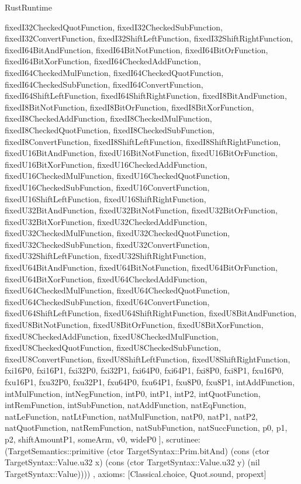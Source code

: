 \begin{lexlean}{RustRuntime}
\begin{semanticmodule}
{{      fixedI32CheckedQuotFunction,
      fixedI32CheckedSubFunction,
      fixedI32ConvertFunction,
      fixedI32ShiftLeftFunction,
      fixedI32ShiftRightFunction,
      fixedI64BitAndFunction,
      fixedI64BitNotFunction,
      fixedI64BitOrFunction,
      fixedI64BitXorFunction,
      fixedI64CheckedAddFunction,
      fixedI64CheckedMulFunction,
      fixedI64CheckedQuotFunction,
      fixedI64CheckedSubFunction,
      fixedI64ConvertFunction,
      fixedI64ShiftLeftFunction,
      fixedI64ShiftRightFunction,
      fixedI8BitAndFunction,
      fixedI8BitNotFunction,
      fixedI8BitOrFunction,
      fixedI8BitXorFunction,
      fixedI8CheckedAddFunction,
      fixedI8CheckedMulFunction,
      fixedI8CheckedQuotFunction,
      fixedI8CheckedSubFunction,
      fixedI8ConvertFunction,
      fixedI8ShiftLeftFunction,
      fixedI8ShiftRightFunction,
      fixedU16BitAndFunction,
      fixedU16BitNotFunction,
      fixedU16BitOrFunction,
      fixedU16BitXorFunction,
      fixedU16CheckedAddFunction,
      fixedU16CheckedMulFunction,
      fixedU16CheckedQuotFunction,
      fixedU16CheckedSubFunction,
      fixedU16ConvertFunction,
      fixedU16ShiftLeftFunction,
      fixedU16ShiftRightFunction,
      fixedU32BitAndFunction,
      fixedU32BitNotFunction,
      fixedU32BitOrFunction,
      fixedU32BitXorFunction,
      fixedU32CheckedAddFunction,
      fixedU32CheckedMulFunction,
      fixedU32CheckedQuotFunction,
      fixedU32CheckedSubFunction,
      fixedU32ConvertFunction,
      fixedU32ShiftLeftFunction,
      fixedU32ShiftRightFunction,
      fixedU64BitAndFunction,
      fixedU64BitNotFunction,
      fixedU64BitOrFunction,
      fixedU64BitXorFunction,
      fixedU64CheckedAddFunction,
      fixedU64CheckedMulFunction,
      fixedU64CheckedQuotFunction,
      fixedU64CheckedSubFunction,
      fixedU64ConvertFunction,
      fixedU64ShiftLeftFunction,
      fixedU64ShiftRightFunction,
      fixedU8BitAndFunction,
      fixedU8BitNotFunction,
      fixedU8BitOrFunction,
      fixedU8BitXorFunction,
      fixedU8CheckedAddFunction,
      fixedU8CheckedMulFunction,
      fixedU8CheckedQuotFunction,
      fixedU8CheckedSubFunction,
      fixedU8ConvertFunction,
      fixedU8ShiftLeftFunction,
      fixedU8ShiftRightFunction,
      fxi16P0,
      fxi16P1,
      fxi32P0,
      fxi32P1,
      fxi64P0,
      fxi64P1,
      fxi8P0,
      fxi8P1,
      fxu16P0,
      fxu16P1,
      fxu32P0,
      fxu32P1,
      fxu64P0,
      fxu64P1,
      fxu8P0,
      fxu8P1,
      intAddFunction,
      intMulFunction,
      intNegFunction,
      intP0,
      intP1,
      intP2,
      intQuotFunction,
      intRemFunction,
      intSubFunction,
      natAddFunction,
      natEqFunction,
      natLeFunction,
      natLtFunction,
      natMulFunction,
      natP0,
      natP1,
      natP2,
      natQuotFunction,
      natRemFunction,
      natSubFunction,
      natSuccFunction,
      p0,
      p1,
      p2,
      shiftAmountP1,
      someArm,
      v0,
      wideP0
    ],
    scrutinee: (TargetSemantics::primitive (ctor TargetSyntax::Prim.bitAnd) (cons (ctor TargetSyntax::Value.u32 x) (cons (ctor TargetSyntax::Value.u32 y) (nil TargetSyntax::Value))))
  },
  axioms: [Classical.choice, Quot.sound, propext]
}


\end{semanticmodule}
\end{lexlean}
